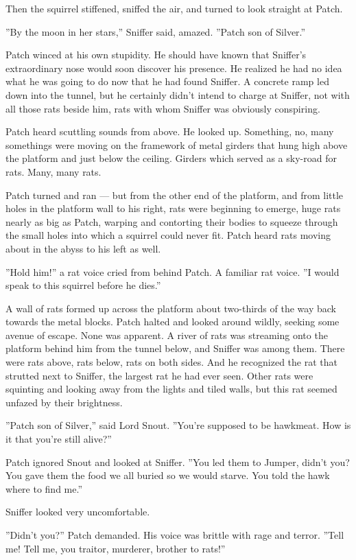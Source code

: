 \documentclass[12pt]{book}
\begin{document}
Then the squirrel stiffened, sniffed the air, and turned to look straight at Patch.

''By the moon in her stars,'' Sniffer said, amazed. ''Patch son of Silver.''

Patch winced at his own stupidity. He should have known that Sniffer's extraordinary nose would soon discover his presence. He realized he had no idea what he was going to do now that he had found Sniffer. A concrete ramp led down into the tunnel, but he certainly didn't intend to charge at Sniffer, not with all those rats beside him, rats with whom Sniffer was obviously conspiring.

Patch heard scuttling sounds from above. He looked up. Something, no, many somethings were moving on the framework of metal girders that hung high above the platform and just below the ceiling. Girders which served as a sky-road for rats. Many, many rats.

Patch turned and ran ---
but from the other end of the platform, and from little holes in the platform wall to his right, rats were beginning to emerge, huge rats nearly as big as Patch, warping and contorting their bodies to squeeze through the small holes into which a squirrel could never fit. Patch heard rats moving about in the abyss to his left as well.

''Hold him!'' a rat voice cried from behind Patch. A familiar rat voice. ''I would speak to this squirrel before he dies.''

A wall of rats formed up across the platform about two-thirds of the way back towards the metal blocks. Patch halted and looked around wildly, seeking some avenue of escape. None was apparent. A river of rats was streaming onto the platform behind him from the tunnel below, and Sniffer was among them. There were rats above, rats below, rats on both sides. And he recognized the rat that strutted next to Sniffer, the largest rat he had ever seen. Other rats were squinting and looking away from the lights and tiled walls, but this rat seemed unfazed by their brightness.

''Patch son of Silver,'' said Lord Snout. ''You're supposed to be hawkmeat. How is it that you're still alive?''

Patch ignored Snout and looked at Sniffer. ''You led them to Jumper, didn't you? You gave them the food we all buried so we would starve. You told the hawk where to find me.''

Sniffer looked very uncomfortable.

''Didn't you?'' Patch demanded. His voice was brittle with rage and terror. ''Tell me! Tell me, you traitor, murderer, brother to rats!''
\end{document}
